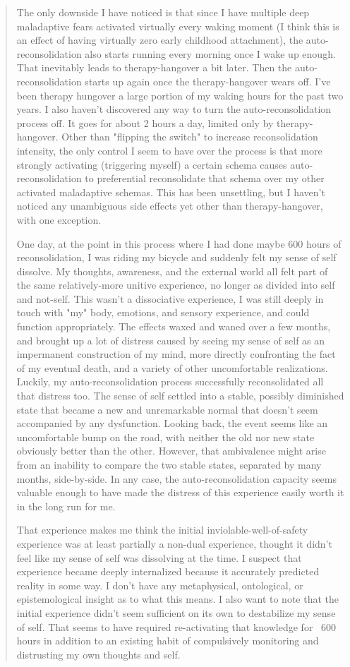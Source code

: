 \documentclass[12pt,letterpaper]{book}
\begin{document}
\begin{quotation}
    The only downside I have noticed is that since I have multiple deep maladaptive fears activated virtually every waking moment (I think this is an effect of having virtually zero early childhood attachment), the auto-reconsolidation also starts running every morning once I wake up enough. That inevitably leads to therapy-hangover a bit later. Then the auto-reconsolidation starts up again once the therapy-hangover wears off. I've been therapy hungover a large portion of my waking hours for the past two years. I also haven't discovered any way to turn the auto-reconsolidation process off. It goes for about 2 hours a day, limited only by therapy-hangover. Other than "flipping the switch" to increase reconsolidation intensity, the only control I seem to have over the process is that more strongly activating (triggering myself) a certain schema causes auto-reconsolidation to preferential reconsolidate that schema over my other activated maladaptive schemas. This has been unsettling, but I haven't noticed any unambiguous side effects yet other than therapy-hangover, with one exception.

    One day, at the point in this process where I had done maybe 600 hours of reconsolidation, I was riding my bicycle and suddenly felt my sense of self dissolve. My thoughts, awareness, and the external world all felt part of the same relatively-more unitive experience, no longer as divided into self and not-self. This wasn't a dissociative experience, I was still deeply in touch with "my" body, emotions, and sensory experience, and could function appropriately. The effects waxed and waned over a few months, and brought up a lot of distress caused by seeing my sense of self as an impermanent construction of my mind, more directly confronting the fact of my eventual death, and a variety of other uncomfortable realizations. Luckily, my auto-reconsolidation process successfully reconsolidated all that distress too. The sense of self settled into a stable, possibly diminished state that became a new and unremarkable normal that doesn't seem accompanied by any dysfunction. Looking back, the event seems like an uncomfortable bump on the road, with neither the old nor new state obviously better than the other. However, that ambivalence might arise from an inability to compare the two stable states, separated by many months, side-by-side. In any case, the auto-reconsolidation capacity seems valuable enough to have made the distress of this experience easily worth it in the long run for me.

    That experience makes me think the initial inviolable-well-of-safety experience was at least partially a non-dual experience, thought it didn't feel like my sense of self was dissolving at the time. I suspect that experience became deeply internalized because it accurately predicted reality in some way. I don't have any metaphysical, ontological, or epistemological insight as to what this means. I also want to note that the initial experience didn't seem sufficient on its own to destabilize my sense of self. That seems to have required re-activating that knowledge for ~600 hours in addition to an existing habit of compulsively monitoring and distrusting my own thoughts and self.


\end{quotation}
\end{document}
